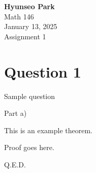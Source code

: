 \documentclass[10pt]{article}
\begin{document}
\begin{center}
    \textbf{Hyunseo Park} \\
    Math 146 \\
    January 13, 2025 \\
    Assignment 1
\end{center}

\section*{Question 1}

\blueline

\begin{enumerate}[{$[$}1{$]$}]
    \item Sample question
    \begin{enumerate}[{$[$}a{$]$}]
        \item Part a)
    \end{enumerate}
\end{enumerate}

\blueline

\begin{theorem}
This is an example theorem.
\end{theorem}

\begin{proofb}
Proof goes here.
\end{proofb}

\vspace{0.5cm}
\begin{center}
    Q.E.D.
\end{center}
\end{document}
